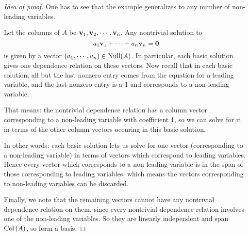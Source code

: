 \begin{proof}[Idea of proof]
One has to see that the example generalizes to any number of 
non-leading variables.  

Let the columns of $A$ be $\mathbf{v}_1,\mathbf{v}_2, \cdots, \mathbf{v}_n$.
Any nontrivial solution to
$$
a_1 \mathbf{v}_1 + \cdots + a_n \mathbf{v}_n = \mathbf{0}
$$
is given by a vector $(a_1, \cdots, a_n)\in \operatorname{Null}(A)$.  In particular,
each basic solution gives one dependence relation on these
vectors.  Now recall that in each basic solution, all but the
last nonzero entry comes from the equation for a leading variable,
and the last nonzero entry is a 1 and corresponds to a non-leading
variable.

That means:  the nontrivial dependence relation has a column vector
corresponding to a non-leading variable with coefficient 1, so we
can solve for it in terms of the other column vectors occuring in
this basic solution.  

In other words: each basic solution lets us solve for one vector 
(corresponding to a non-leading variable) in terms of vectors which
correspond to leading variables.  Hence every vector which 
corresponds to a non-leading variable is in the span of those
corresponding to leading variables, which means the vectors
corresponding to non-leading variables can be discarded.

Finally, we note that the remaining vectors cannot have any
nontrivial dependence relation on them, since every nontrivial
dependence relation involves one of the non-leading variables.
So they are linearly independent and span $\operatorname{Col\,}(A)$, so form a basis.
\end{proof}






